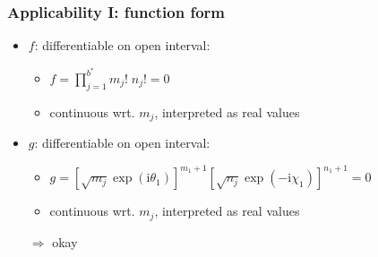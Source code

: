 \documentclass[
	english,
	a4paper,
	fontsize=10pt,
	parskip=half,
	titlepage=true,
	DIV=12,
	final
]{scrreprt}
\newcommand*{\Thus}{\ensuremath{\Rightarrow}\xspace}
\newcommand*{\iunit}{\ensuremath{\mathrm{i}}}
\begin{document}
\subsubsection{Applicability I: function form}
\begin{itemize}
\item $f$: differentiable on open interval:
	\begin{itemize}
	\item $f = \prod_{j=1}^{b^*} m_j! \; n_j! = 0$
	\item continuous wrt. $m_j$, interpreted as real values
	\end{itemize}
\item $g$: differentiable on open interval:
	\begin{itemize}
	\item $g = [\sqrt{m_j} \exp( \iunit \theta_1)]^{m_1 + 1}
			 [\sqrt{n_j} \exp(-\iunit \chi  _1)]^{n_1 + 1} = 0$
	\item continuous wrt. $m_j$, interpreted as real values
	\end{itemize}
\item[\Thus] okay
\end{itemize}
\end{document}
